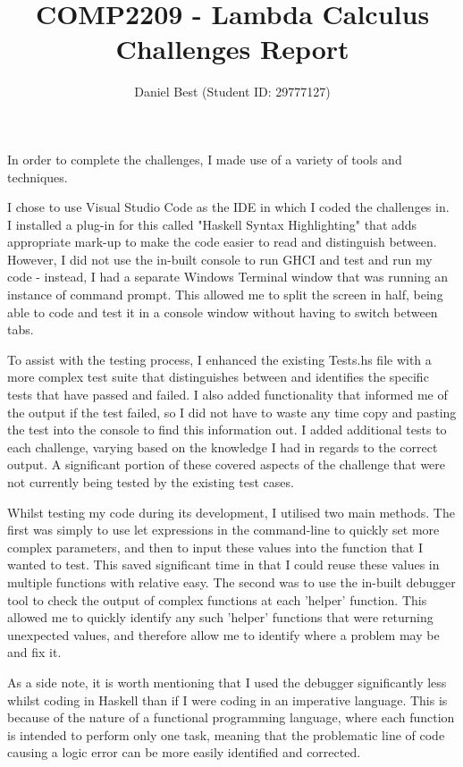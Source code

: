 \documentclass{article}
\title{COMP2209 - Lambda Calculus Challenges Report}
\author{Daniel Best (Student ID: 29777127)}
\begin{document}
	\maketitle
	
	\newpage
	
	In order to complete the challenges, I made use of a variety of tools and techniques. 
	
	I chose to use Visual Studio Code as the IDE in which I coded the challenges in. I installed a plug-in for this called "Haskell Syntax Highlighting" that adds appropriate mark-up to make the code easier to read and distinguish between. However, I did not use the in-built console to run GHCI and test and run my code - instead, I had a separate Windows Terminal window that was running an instance of command prompt. This allowed me to split the screen in half, being able to code and test it in a console window without having to switch between tabs.
	
	To assist with the testing process, I enhanced the existing Tests.hs file with a more complex test suite that distinguishes between and identifies the specific tests that have passed and failed. I also added functionality that informed me of the output if the test failed, so I did not have to waste any time copy and pasting the test into the console to find this information out. I added additional tests to each challenge, varying based on the knowledge I had in regards to the correct output. A significant portion of these covered aspects of the challenge that were not currently being tested by the existing test cases.
	
	Whilst testing my code during its development, I utilised two main methods. The first was simply to use let expressions in the command-line to quickly set more complex parameters, and then to input these values into the function that I wanted to test. This saved significant time in that I could reuse these values in multiple functions with relative easy. The second was to use the in-built debugger tool to check the output of complex functions at each 'helper' function. This allowed me to quickly identify any such 'helper' functions that were returning unexpected values, and therefore allow me to identify where a problem may be and fix it. 
	
	As a side note, it is worth mentioning that I used the debugger significantly less whilst coding in Haskell than if I were coding in an imperative language. This is because of the nature of a functional programming language, where each function is intended to perform only one task, meaning that the problematic line of code causing a logic error can be more easily identified and corrected.
	
\end{document}
